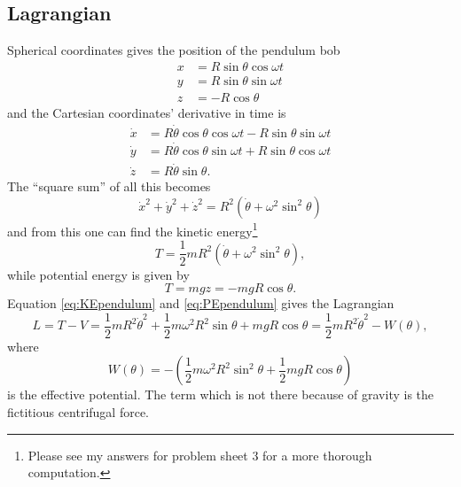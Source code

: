 \documentclass[11pt]{amsart}
\begin{document}
\subsection{Lagrangian}
Spherical coordinates gives the position of the pendulum bob
\begin{align*}
x &= R\sin\theta\cos\omega t \\
y &= R\sin\theta\sin\omega t \\
z &= -R\cos\theta
\end{align*}
and the Cartesian coordinates' derivative in time is
\begin{align*}
\dot{x} &= R\dot{\theta}\cos\theta\cos\omega t - R\sin\theta\sin\omega t \\
\dot{y} &= R\dot{\theta}\cos\theta\sin\omega t + R\sin\theta\cos\omega t \\
\dot{z} &= R\dot{\theta}\sin\theta.
\end{align*}
The ``square sum'' of all this becomes
\begin{equation*}
\dot{x}^2 + \dot{y}^2 + \dot{z}^2 = R^2(\dot{\theta} + \omega^2\sin^2\theta)
\end{equation*}
and from this one can find the kinetic energy\footnote{Please see my answers for problem sheet 3 for a more thorough computation.}
\begin{equation}
\label{eq:KEpendulum}
T = \frac{1}{2}mR^2(\dot{\theta} + \omega^2\sin^2\theta),
\end{equation}
while potential energy is given by
\begin{equation}
\label{eq:PEpendulum}
T = mgz = -mgR\cos\theta.
\end{equation}
Equation \ref{eq:KEpendulum} and \ref{eq:PEpendulum} gives the Lagrangian
\begin{equation}
\label{eq:lagrangianpendulum}
L = T - V = \frac{1}{2}mR^2\dot{\theta}^2 + \frac{1}{2}m\omega^2R^2\sin\theta + mgR\cos\theta
 = \frac{1}{2}mR^2\dot{\theta}^2 - W(\theta),
\end{equation}
where 
\begin{equation*}
W(\theta) = -\left(\frac{1}{2}m\omega^2 R^2\sin^2\theta + \frac{1}{2}mgR\cos\theta\right)
\end{equation*}
is the effective potential. The term which is not there because of gravity is the fictitious centrifugal force. 
\end{document}
